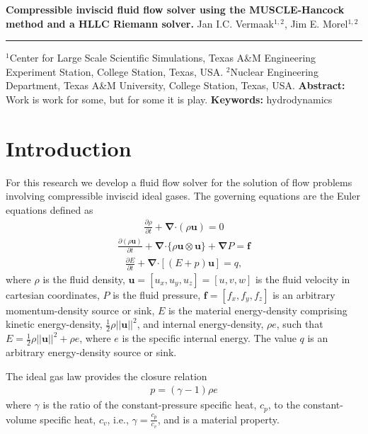 \documentclass[10pt,letterpaper,notitlepage]{article}
\numberwithin{equation}{section}
\newcommand{\DOCTITLE}{Compressible inviscid fluid flow solver using the MUSCLE-Hancock method and a HLLC Riemann solver.}
\newcommand{\partialderiv}[2]{\frac{\partial #1}{\partial #2}}
\newcommand{\bnabla}{\boldsymbol{\nabla}}
\newcommand{\velocity}{\mathbf{u}}
\newcommand{\dotp}{\boldsymbol{\cdot}}
\newcommand{\beqn}{\begin{equation}\begin{aligned}}
\newcommand{\eeqn}{\end{aligned}\end{equation}}
\begin{document}
\noindent
{\LARGE\textbf{\DOCTITLE}}
\newline
\newline
\newline
\noindent
{\Large Jan I.C. Vermaak$^{1,2}$, Jim E. Morel$^{1,2}$}
\newline
\noindent\rule{\textwidth}{1pt}
{\small $^1$Center for Large Scale Scientific Simulations, Texas A\&M Engineering Experiment Station, College Station, Texas, USA.}
\newline\noindent
{\small $^2$Nuclear Engineering Department, Texas A\&M University, College Station, Texas, USA.}
\newline
\newline
\textbf{Abstract:}\newline\noindent
Work is work for some, but for some it is play.
\newline
\newline\noindent
{\small
\textbf{Keywords:} hydrodynamics}

\section{Introduction}
For this research we develop a fluid flow solver for the solution of flow problems involving compressible inviscid ideal gases. The governing equations are the Euler equations defined as
\beqn 
\partialderiv{\rho}{t} + \bnabla \dotp (\rho \velocity) = 0
\eeqn 
\beqn 
\partialderiv{(\rho\velocity)}{t} + \bnabla \dotp \{ \rho \velocity \otimes \velocity\}  + \bnabla P = \mathbf{f}
\eeqn 
\beqn 
\partialderiv{E}{t} + \bnabla \dotp [(E + p)\velocity] = q,
\eeqn 
where $\rho$ is the fluid density, $\velocity = [u_x, u_y, u_z] =[u,v,w]$ is the fluid velocity in cartesian coordinates, $P$ is the fluid pressure, $\mathbf{f} = [f_x,f_y,f_z]$ is an arbitrary momentum-density source or sink, $E$ is the material energy-density comprising kinetic energy-density, $\frac{1}{2} \rho ||\velocity||^2$, and internal energy-density, $\rho e$, such that $E = \frac{1}{2} \rho ||\velocity||^2 + \rho e$, where $e$ is the specific internal energy. The value $q$ is an arbitrary energy-density source or sink.

The ideal gas law provides the closure relation
\beqn 
p = (\gamma - 1) \rho e
\eeqn 
where $\gamma$ is the ratio of the constant-pressure specific heat, $c_p$, to the constant-volume specific heat, $c_v$, i.e., $\gamma = \frac{c_p}{c_v}$, and is a material property.

\vspace{1cm}
\end{document}
